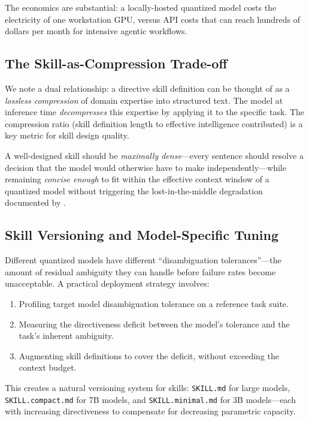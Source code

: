 \documentclass[11pt,a4paper]{article}
\begin{document}
The economics are substantial: a locally-hosted quantized model costs the
electricity of one workstation GPU, versus API costs that can reach hundreds
of dollars per month for intensive agentic workflows.

\subsection{The Skill-as-Compression Trade-off}

We note a dual relationship: a directive skill definition can be thought of
as a \emph{lossless compression} of domain expertise into structured text.
The model at inference time \emph{decompresses} this expertise by applying
it to the specific task. The compression ratio (skill definition length to
effective intelligence contributed) is a key metric for skill design quality.

A well-designed skill should be \emph{maximally dense}—every sentence should
resolve a decision that the model would otherwise have to make
independently—while remaining \emph{concise enough} to fit within the
effective context window of a quantized model without triggering the
lost-in-the-middle degradation documented by \citet{liu2023lost}.

\subsection{Skill Versioning and Model-Specific Tuning}

Different quantized models have different ``disambiguation tolerances''—the
amount of residual ambiguity they can handle before failure rates become
unacceptable. A practical deployment strategy involves:

\begin{enumerate}
  \item Profiling target model disambiguation tolerance on a reference task suite.
  \item Measuring the directiveness deficit between the model's tolerance and
    the task's inherent ambiguity.
  \item Augmenting skill definitions to cover the deficit, without exceeding
    the context budget.
\end{enumerate}

This creates a natural versioning system for skills: \texttt{SKILL.md} for
large models, \texttt{SKILL.compact.md} for 7B models, and
\texttt{SKILL.minimal.md} for 3B models—each with increasing directiveness
to compensate for decreasing parametric capacity.
\end{document}
